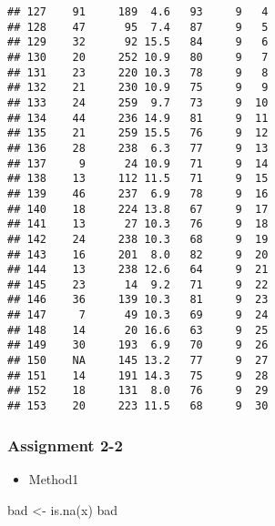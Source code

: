 \documentclass[
]{article}
\newenvironment{Shaded}{\begin{snugshade}}{\end{snugshade}}
\newcommand{\FunctionTok}[1]{\textcolor[rgb]{0.00,0.00,0.00}{#1}}
\newcommand{\NormalTok}[1]{#1}
\newcommand{\OtherTok}[1]{\textcolor[rgb]{0.56,0.35,0.01}{#1}}
\providecommand{\tightlist}{%
  \setlength{\itemsep}{0pt}\setlength{\parskip}{0pt}}
\begin{document}
\begin{verbatim}
## 127    91     189  4.6   93     9   4
## 128    47      95  7.4   87     9   5
## 129    32      92 15.5   84     9   6
## 130    20     252 10.9   80     9   7
## 131    23     220 10.3   78     9   8
## 132    21     230 10.9   75     9   9
## 133    24     259  9.7   73     9  10
## 134    44     236 14.9   81     9  11
## 135    21     259 15.5   76     9  12
## 136    28     238  6.3   77     9  13
## 137     9      24 10.9   71     9  14
## 138    13     112 11.5   71     9  15
## 139    46     237  6.9   78     9  16
## 140    18     224 13.8   67     9  17
## 141    13      27 10.3   76     9  18
## 142    24     238 10.3   68     9  19
## 143    16     201  8.0   82     9  20
## 144    13     238 12.6   64     9  21
## 145    23      14  9.2   71     9  22
## 146    36     139 10.3   81     9  23
## 147     7      49 10.3   69     9  24
## 148    14      20 16.6   63     9  25
## 149    30     193  6.9   70     9  26
## 150    NA     145 13.2   77     9  27
## 151    14     191 14.3   75     9  28
## 152    18     131  8.0   76     9  29
## 153    20     223 11.5   68     9  30
\end{verbatim}

\hypertarget{assignment-2-2}{%
\subsubsection{Assignment 2-2}\label{assignment-2-2}}

\begin{itemize}
\tightlist
\item
  Method1
\end{itemize}

\begin{Shaded}
\begin{Highlighting}[]
\NormalTok{bad }\OtherTok{\textless{}{-}} \FunctionTok{is.na}\NormalTok{(x)}
\NormalTok{bad}
\end{Highlighting}
\end{Shaded}
\end{document}

